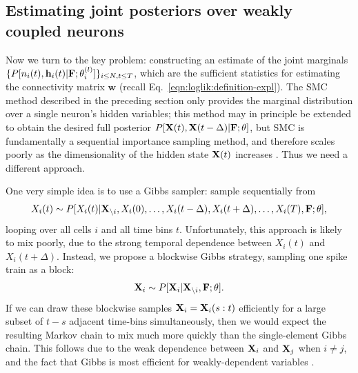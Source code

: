 \documentclass[aoas,preprint]{imsart}
\providecommand{\tr}[1]{\textcolor{red}{#1}}
\renewcommand{\i}{\backslash i}
\newcommand{\bth}{\mathbf{\theta}}
\newcommand{\w}{w}
\newcommand{\bw}{\mathbf{\w}}
\newcommand{\bF}{{\bf F}}
\newcommand{\bX}{{\bf X}}
\newcommand{\bh}{\mathbf{h}}
\begin{document}
\subsection{Estimating joint posteriors over weakly coupled neurons}
\label{sec:methods:joint}

Now we turn to the key problem: constructing an estimate of the joint marginals \tr{$\{P[n_i(t), \bh_i(t) | \bF;\bth_i^{(l)}]\}_{i\leq N, t\leq T}$}, which are the sufficient statistics for estimating the connectivity matrix $\bw$ (recall Eq.~\eqref{eqn:loglik:definition-expl}). The SMC method described in the preceding section only provides the marginal distribution over a single neuron's hidden variables; this method may in principle be extended to obtain the desired full posterior $P[\bX(t), \bX(t-\Delta) | \bF; \bth]$, but SMC is fundamentally a sequential importance sampling method, and therefore scales poorly as the dimensionality of the hidden state $\bX(t)$ increases \cite{BickelBengtsson08}. Thus we need a different approach.

One very simple idea is to use a Gibbs sampler: sample sequentially
from
\begin{align}
X_i(t) \sim P[X_i(t) | \bX_{\i}, X_i(0), \ldots, X_i(t-\Delta),
 X_i(t+\Delta), \ldots, X_i(T), \bF; \bth],
\end{align}
looping over all cells $i$ and all time bins $t$. Unfortunately, this approach is likely to mix poorly, due to the strong temporal dependence between $X_i(t)$ and $X_i(t+\Delta)$. Instead, we propose a blockwise Gibbs strategy, sampling one spike train as a block:
\begin{align}
	\bX_i \sim P[\bX_i | \bX_{\i}, \bF; \bth].
\end{align}
If we can draw these blockwise samples $\bX_i = \bX_i(s:t)$
efficiently for a large subset of $t-s$ adjacent time-bins
simultaneously, then we would expect the resulting Markov chain to mix
much more quickly than the single-element Gibbs chain.  This follows
due to the weak dependence between $\bX_i$ and $\bX_j$ when $i\neq j$,
and the fact that Gibbs is most efficient for weakly-dependent
variables \cite{RC05}.
\end{document}
